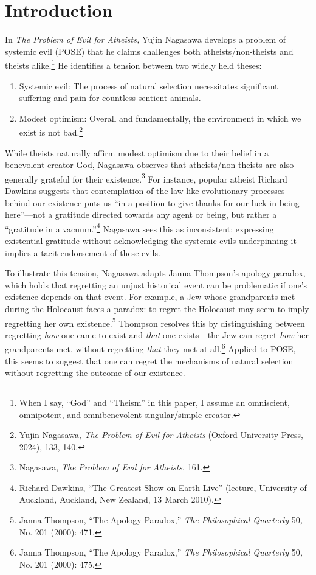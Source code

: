 \vspace{\credgap}

\section*{Introduction}

In \emph{The Problem of Evil for Atheists,} Yujin Nagasawa develops a
problem of systemic evil (POSE) that he claims challenges both
atheists/non-theists and theists alike.\footnote{When I say, ``God'' and
  ``Theism'' in this paper, I assume an omniscient, omnipotent, and
  omnibenevolent singular/simple creator.} He identifies a tension
between two widely held theses: 

\begin{enumerate}[leftmargin=42pt]
\def\labelenumi{(\arabic{enumi})}
\item
  Systemic evil: The process of natural selection necessitates
  significant suffering and pain for countless sentient animals.
\item
  Modest optimism: Overall and fundamentally, the environment in which
  we exist is not bad.\footnote{Yujin Nagasawa, \emph{The Problem of
    Evil for Atheists} (Oxford University Press, 2024), 133, 140.}
\end{enumerate}

\noindent While theists naturally affirm modest optimism due to their belief in a
benevolent creator God, Nagasawa observes that atheists/non-theists are
also generally grateful for their existence.\footnote{Nagasawa,
  \emph{The Problem of Evil for Atheists}, 161.} For instance, popular
atheist Richard Dawkins suggests that contemplation of the law-like
evolutionary processes behind our existence puts us ``in a position to
give thanks for our luck in being here''---not a gratitude directed
towards any agent or being, but rather a ``gratitude in a
vacuum.''\footnote{Richard Dawkins, ``The Greatest Show on Earth
  Live'' (lecture, University of Auckland, Auckland, New Zealand, 13
  March 2010).} Nagasawa sees this as inconsistent: expressing
existential gratitude without acknowledging the systemic evils
underpinning it implies a tacit endorsement of these evils.

To illustrate this tension, Nagasawa adapts Janna Thompson's apology
paradox, which holds that regretting an unjust historical event can be
problematic if one's existence depends on that event. For example, a Jew
whose grandparents met during the Holocaust faces a paradox: to regret
the Holocaust may seem to imply regretting her own existence.\footnote{Janna
  Thompson, ``The Apology Paradox,'' \emph{The Philosophical Quarterly}
  50\emph{,} No. 201 (2000): 471.} Thompson resolves this by
distinguishing between regretting \emph{how} one came to exist and
\emph{that} one exists---the Jew can regret \emph{how} her grandparents
met, without regretting \emph{that} they met at all.\footnote{Janna
  Thompson, ``The Apology Paradox,'' \emph{The Philosophical Quarterly}
  50\emph{,} No. 201 (2000): 475.} Applied to POSE, this seems to suggest that one can regret the
mechanisms of natural selection without regretting the outcome of our
existence.

